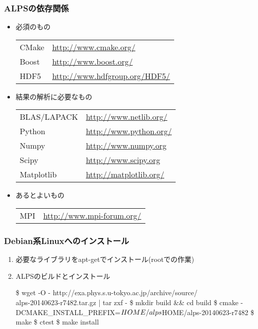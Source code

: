 \begin{frame}
  \frametitle{ALPSの依存関係}
  \begin{itemize}
  \item 必須のもの\\
    \begin{tabular}{ll}
      CMake & \url{http://www.cmake.org/} \\
      Boost & \url{http://www.boost.org/} \\
      HDF5  & \url{http://www.hdfgroup.org/HDF5/} \\
    \end{tabular}
  \item 結果の解析に必要なもの \\
    \begin{tabular}{ll}
      BLAS/LAPACK & \url{http://www.netlib.org/} \\
      Python & \url{http://www.python.org/} \\
      Numpy & \url{http://www.numpy.org} \\
      Scipy & \url{http://www.scipy.org} \\
      Matplotlib & \url{http://matplotlib.org/}
    \end{tabular}
  \item あるとよいもの \\
    \begin{tabular}{ll}
      MPI & \url{http://www.mpi-forum.org/} \\
    \end{tabular}
  \end{itemize}
\end{frame}

\begin{frame}[fragile,shrink=10]
  \frametitle{Debian系Linuxへのインストール}
  \begin{enumerate}
  \item 必要なライブラリをapt-getでインストール(rootでの作業)
  \item ALPSのビルドとインストール
\begin{semiverbatim}
\$ wget -O - http://exa.phys.s.u-tokyo.ac.jp/archive/source/\\
  alps-20140623-r7482.tar.gz | tar zxf -
\$ mkdir build && cd build
\$ cmake -DCMAKE_INSTALL_PREFIX=${HOME}/alps \\
  $HOME/alps-20140623-r7482
\$ make
\$ ctest
\$ make install
\end{semiverbatim}
  \end{enumerate}
\end{frame}

